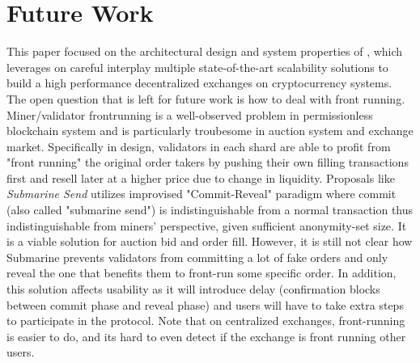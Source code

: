 \section{Future Work}
This paper focused on the architectural design and system properties of \codename, which
leverages on careful interplay multiple state-of-the-art scalability solutions to build a
high performance decentralized exchanges on cryptocurrency systems. The open question that is left for future work is
 how to deal with front running. Miner/validator frontrunning is a well-observed
  problem in permissionless blockchain system and is particularly troubesome in auction system
  and exchange market. Specifically in \codename design, validators in each shard are able to profit from
  "front running" the original order takers by pushing their own filling transactions first and resell later
  at a higher price due to change in liquidity. Proposals like \textit{Submarine Send}\cite{submarine}
  utilizes improvised "Commit-Reveal" paradigm where commit (also called "submarine send") is indistinguishable
  from a normal transaction thus indistinguishable from miners' perspective, given sufficient anonymity-set size. It is
  a viable solution for auction bid and order fill. However, it is still not clear how Submarine prevents validators from committing a lot of fake orders and only reveal the one that benefits them to front-run some specific order. In addition, this solution affects usability as it will introduce delay (confirmation blocks between commit phase
  and reveal phase) and users will have to take extra steps to participate in the protocol. 
  Note that on centralized exchanges, front-running is easier to do, and its hard to even detect if the exchange is front running other users.

